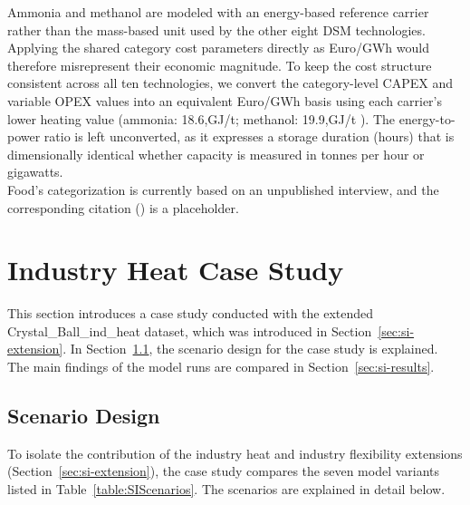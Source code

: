 Ammonia and methanol are modeled with an energy-based reference carrier rather than the mass-based unit used by the other eight DSM technologies. Applying the shared category cost parameters directly as Euro/GWh would therefore misrepresent their economic magnitude.  To keep the cost structure consistent across all ten technologies, we convert the category-level CAPEX and variable OPEX values into an equivalent Euro/GWh basis using each carrier's lower heating value (ammonia: 18.6,GJ/t; methanol: 19.9,GJ/t \cite{IEAAMF2026}). The energy-to-power ratio is left unconverted, as it expresses a storage duration (hours) that is dimensionally identical whether capacity is measured in tonnes per hour or gigawatts. \\

Food's categorization is currently based on an unpublished interview, and the corresponding citation (\cite{AnaInterview2026}) is a placeholder. %

\section{Industry Heat Case Study}
\label{sec:si-casestudy}

This section introduces a case study conducted with the extended Crystal\_Ball\_ind\_heat dataset, which was introduced in Section~\ref{sec:si-extension}. In Section~\ref{sec:si-scenarios}, the scenario design for the case study is explained. The main findings of the model runs are compared in Section~\ref{sec:si-results}. 

\subsection{Scenario Design}
\label{sec:si-scenarios}

To isolate the contribution of the industry heat and industry flexibility extensions (Section~\ref{sec:si-extension}), the case study compares the seven model variants listed in Table~\ref{table:SIScenarios}. The scenarios are explained in detail below. \\

